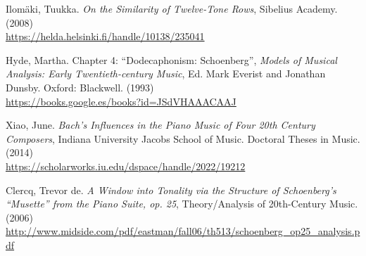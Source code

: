 \begin{thebibliography}{00}
			
			{ Ilom\"aki, Tuukka.}
			\textit{On the Similarity of Twelve-Tone Rows},
			Sibelius Academy.
			(2008)
			\\\url{https://helda.helsinki.fi/handle/10138/235041}
			
			{ Hyde, Martha.} Chapter 4: ``Dodecaphonism: Schoenberg'',
			\textit{Models of Musical Analysis: Early Twentieth-century Music},
			Ed. Mark Everist and Jonathan Dunsby.
			Oxford: Blackwell.
			(1993)
			\\\url{https://books.google.es/books?id=JSdVHAAACAAJ}
					
			{ Xiao, June.} 
			\textit{Bach's Influences in the Piano Music of Four 20th Century Composers},
			Indiana University Jacobs School of Music.
			Doctoral Theses in Music.
			(2014)
			\\\url{https://scholarworks.iu.edu/dspace/handle/2022/19212}
			
			{ Clercq, Trevor de.} 
			\textit{A Window into Tonality via the Structure of Schoenberg's ``Musette'' from the Piano Suite, op. 25},
			Theory/Analysis of 20th-Century Music.
			(2006)
			\\\url{http://www.midside.com/pdf/eastman/fall06/th513/schoenberg_op25_analysis.pdf}
			
%			
%			
%			
%			
%			
%			
			

\end{thebibliography}
